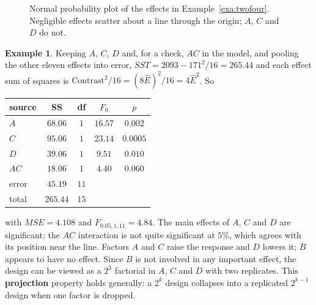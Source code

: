 \documentclass[11pt,a4paper]{article}
\numberwithin{equation}{section}
\theoremstyle{definition}
\newtheorem{exa}[thm]{Example}
\begin{document}
\begin{figure}[H]
\centering
{}
\caption{Normal probability plot of the effects in Example~\ref{exa:twofour}. Negligible effects scatter about a line through the origin; $A$, $C$ and $D$ do not.}
\label{fig:normal-effects}
\end{figure}

\begin{exa}\label{exa:twofour-anova}
Keeping $A$, $C$, $D$ and, for a check, $AC$ in the model, and pooling the other eleven effects into error, $SST = 2093 - 171^2/16 = 265.44$ and each effect
sum of squares is $\text{Contrast}^2/16 = (8\hat E)^2/16 = 4\hat E^2$. So
\begin{center}
\begin{tabular}{l|c|c|c|c}
source & SS & df & $F_0$ & $p$ \\
\hline
$A$ & $68.06$ & $1$ & $16.57$ & $0.002$ \\
$C$ & $95.06$ & $1$ & $23.14$ & $0.0005$ \\
$D$ & $39.06$ & $1$ & $9.51$ & $0.010$ \\
$AC$ & $18.06$ & $1$ & $4.40$ & $0.060$ \\
error & $45.19$ & $11$ & & \\
\hline
total & $265.44$ & $15$ & &
\end{tabular}
\end{center}
with $MSE = 4.108$ and $F_{0.05,1,11} = 4.84$. The main effects of $A$, $C$ and $D$ are significant; the $AC$ interaction is not quite significant at $5\%$, which
agrees with its position near the line. Factors $A$ and $C$ raise the response and $D$ lowers it; $B$ appears to have no effect. Since $B$ is not
involved in any important effect, the design can be viewed as a $2^3$ factorial in $A$, $C$ and $D$ with two replicates. This \textbf{projection} property
holds generally: a $2^k$ design collapses into a replicated $2^{k-1}$ design when one factor is dropped.
\end{exa}
\end{document}
